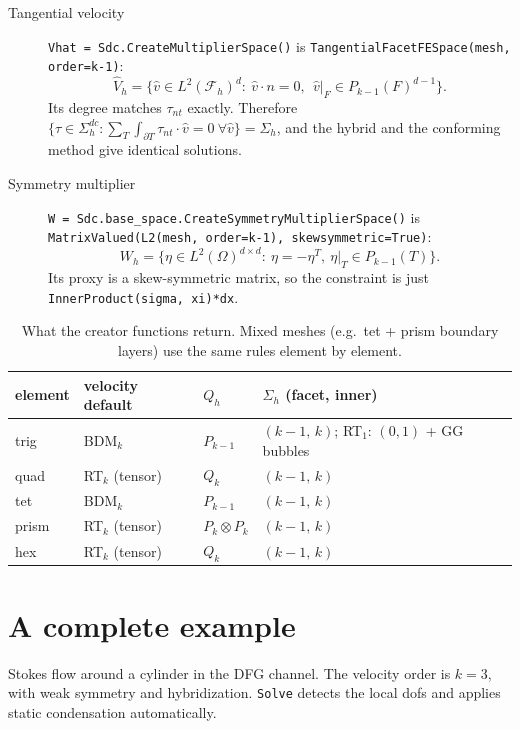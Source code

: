 \documentclass[10pt,a4paper]{article}
\newcommand{\code}[1]{\texttt{#1}}
\newcommand{\Fh}{\mathcal{F}_h}
\begin{document}
\begin{description}
\item[Tangential velocity] \code{Vhat = Sdc.CreateMultiplierSpace()} is \code{TangentialFacetFESpace(mesh, order=k-1)}:
  \[
    \hat V_h = \{\hat v \in L^2(\Fh)^d:\ \hat v\cdot n = 0,\ \ \hat v|_F \in P_{k-1}(F)^{d-1}\}.
  \]
  Its degree matches $\tau_{nt}$ exactly. Therefore $\{\tau \in \Sigma_h^{dc}: \sum_T\int_{\partial T}\tau_{nt}\cdot\hat v = 0\ \forall \hat v\} = \Sigma_h$, and the hybrid and the conforming method give identical solutions.

\item[Symmetry multiplier] \code{W = Sdc.base\_space.CreateSymmetryMultiplierSpace()} is \code{MatrixValued(L2(mesh, order=k-1), skewsymmetric=True)}:
  \[
    W_h = \{\eta \in L^2(\Omega)^{d\times d}:\ \eta = -\eta^T,\ \eta|_T\in P_{k-1}(T)\}.
  \]
  Its proxy is a skew-symmetric matrix, so the constraint is just \code{InnerProduct(sigma, xi)*dx}.
\end{description}

\begin{table}[h]\centering\small
\begin{tabular}{@{}llll@{}}\toprule
 element & velocity default & $Q_h$ & $\Sigma_h$ (facet, inner)\\\midrule
 trig  & BDM$_k$ & $P_{k-1}$ & $(k-1,\,k)$; RT$_1$: $(0,1)$ + GG bubbles\\
 quad  & RT$_k$ (tensor) & $Q_k$ & $(k-1,\,k)$\\
 tet   & BDM$_k$ & $P_{k-1}$ & $(k-1,\,k)$\\
 prism & RT$_k$ (tensor) & $P_k\otimes P_k$ & $(k-1,\,k)$\\
 hex   & RT$_k$ (tensor) & $Q_k$ & $(k-1,\,k)$\\\bottomrule
\end{tabular}
\caption{What the creator functions return. Mixed meshes (e.g.\ tet + prism boundary layers) use the same rules element by element.}
\end{table}

\section{A complete example}

Stokes flow around a cylinder in the DFG channel. The velocity order is $k=3$, with weak symmetry and hybridization. \code{Solve} detects the local dofs and applies static condensation automatically.
\end{document}
